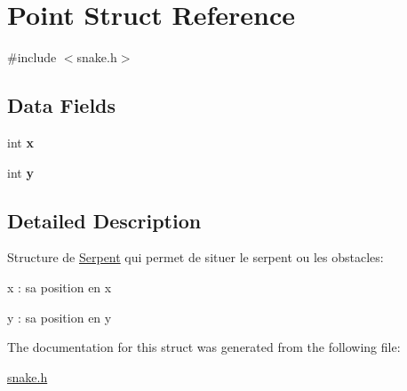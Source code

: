\hypertarget{struct_point}{}\section{Point Struct Reference}
\label{struct_point}


{\ttfamily \#include $<$snake.\+h$>$}

\subsection*{Data Fields}
\begin{DoxyCompactItemize}
\item 
\hypertarget{struct_point_a6150e0515f7202e2fb518f7206ed97dc}{}int {\bfseries x}\label{struct_point_a6150e0515f7202e2fb518f7206ed97dc}

\item 
\hypertarget{struct_point_a0a2f84ed7838f07779ae24c5a9086d33}{}int {\bfseries y}\label{struct_point_a0a2f84ed7838f07779ae24c5a9086d33}

\end{DoxyCompactItemize}


\subsection{Detailed Description}
Structure de \hyperlink{struct_serpent}{Serpent} qui permet de situer le serpent ou les obstacles\+:
\begin{DoxyItemize}
\item x \+: sa position en x
\item y \+: sa position en y 
\end{DoxyItemize}

The documentation for this struct was generated from the following file\+:\begin{DoxyCompactItemize}
\item 
\hyperlink{snake_8h}{snake.\+h}\end{DoxyCompactItemize}
